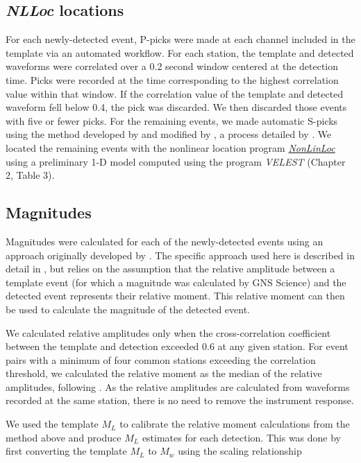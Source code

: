 \subsection{\textit{NLLoc} locations}
For each newly-detected event, P-picks were made at each channel included in the template via an automated workflow. For each station, the template and detected waveforms were correlated over a 0.2 second window centered at the detection time. Picks were recorded at the time corresponding to the highest correlation value within that window. If the correlation value of the template and detected waveform fell below 0.4, the pick was discarded. We then discarded those events with five or fewer picks. For the remaining events, we made automatic S-picks using the method developed by \citet{Diehl_2009} and modified by \citet{Castellazzi_2015}, a process detailed by \citep{mroczek2016shear}. We located the remaining events with the nonlinear location program \href{http://alomax.free.fr/nlloc/}{\textit{NonLinLoc}} \citep{Lomax_2014} using a preliminary 1-D model computed using the program \textit{VELEST} \citep{Kissling_1994,sewell2017}(Chapter 2, Table 3).

\subsection{Magnitudes}
Magnitudes were calculated for each of the newly-detected events using an approach originally developed by \citet{Shelly_2016}. The specific approach used here is described in detail in \citet{j2019}, but relies on the assumption that the relative amplitude between a template event (for which a magnitude was calculated by GNS Science) and the detected event represents their relative moment. This relative moment can then be used to calculate the magnitude of the detected event.

We calculated relative amplitudes only when the cross-correlation coefficient between the template and detection exceeded 0.6 at any given station. For event pairs with a minimum of four common stations exceeding the correlation threshold, we calculated the relative moment as the median of the relative amplitudes, following \citet{Shelly_2016}. As the relative amplitudes are calculated from waveforms recorded at the same station, there is no need to remove the instrument response.

We used the template $M_{L}$ to calibrate the relative moment calculations from the method above and produce $M_{L}$ estimates for each detection. This was done by first converting the template $M_{L}$ to $M_{w}$ using the scaling relationship

